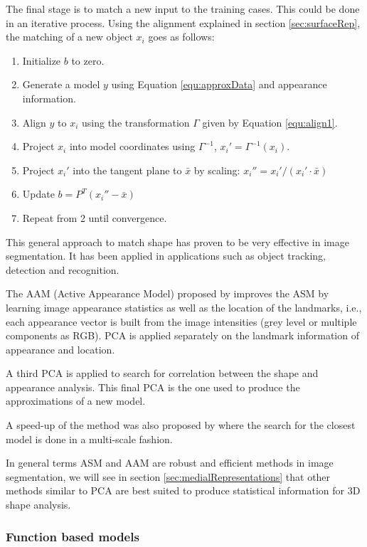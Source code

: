 The final stage is to match a new input to the training cases.
This could be done in an iterative process. 
Using the alignment explained in section \ref{sec:surfaceRep},
the matching of a new object $x_i$ goes as follows: 

\begin{enumerate}
 \item Initialize $b$ to zero.
 \item Generate a model $y$ using Equation \ref{equ:approxData} and appearance information.
 \item Align $y$ to $x_i$ using the transformation $\Gamma$ given by Equation \ref{equ:align1}.
 \item Project $x_i$ into model coordinates using $\Gamma^{-1}$, $x_i' = \Gamma^{-1}(x_i)$.
 \item Project $x_i'$ into the tangent plane to $\bar{x}$ by scaling: $x_i'' = x_i'/(x_i' \cdot \bar{x})$
 \item Update $b = P^T (x_i'' - \bar{x})$
 \item Repeat from 2 until convergence.
\end{enumerate}

This general approach to match shape has proven to be very effective in image segmentation. 
It has been applied in applications such as object tracking, detection and recognition.

The AAM (Active Appearance Model) proposed by \cite{cootes2001active} improves the ASM by learning image appearance
statistics as well as the location 
of the landmarks, i.e., each appearance vector is built from the image intensities (grey level or multiple components as RGB).
PCA is applied separately on the landmark information of appearance and location.

A third PCA is applied to search for correlation between the shape and appearance analysis. 
This final PCA is the one used to produce the approximations of a new model.

A speed-up of the method was also proposed by \cite{mitchell20023} where the search for the closest model is done in a multi-scale 
fashion. 

In general terms ASM and AAM are robust and efficient methods in image segmentation, 
we will see in section \ref{sec:medialRepresentations} that 
other methods similar to PCA are best suited to produce statistical information for 3D shape analysis.

\subsubsection{Function based models} 


